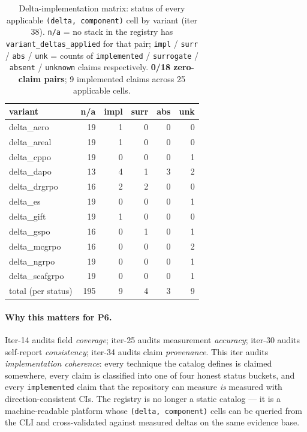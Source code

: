 \begin{table}[t]
\centering\small
\caption{Delta-implementation matrix: status of every applicable
\texttt{(delta, component)} cell by variant (iter 38). \texttt{n/a}
= no stack in the registry has \texttt{variant\_deltas\_applied} for
that pair; \texttt{impl} / \texttt{surr} / \texttt{abs} / \texttt{unk}
= counts of \texttt{implemented} / \texttt{surrogate} / \texttt{absent}
/ \texttt{unknown} claims respectively. \textbf{0/18 zero-claim pairs};
9 implemented claims across 25 applicable cells.}
\label{tab:p6-delta-implementation}
\begin{tabular}{l r r r r r}
\toprule
variant & n/a & impl & surr & abs & unk \\
\midrule
delta\_aero      & 19 & 1 & 0 & 0 & 0 \\
delta\_areal     & 19 & 1 & 0 & 0 & 0 \\
delta\_cppo      & 19 & 0 & 0 & 0 & 1 \\
delta\_dapo      & 13 & 4 & 1 & 3 & 2 \\
delta\_drgrpo    & 16 & 2 & 2 & 0 & 0 \\
delta\_es        & 19 & 0 & 0 & 0 & 1 \\
delta\_gift      & 19 & 1 & 0 & 0 & 0 \\
delta\_gspo      & 16 & 0 & 1 & 0 & 1 \\
delta\_mcgrpo    & 16 & 0 & 0 & 0 & 2 \\
delta\_ngrpo     & 19 & 0 & 0 & 0 & 1 \\
delta\_scafgrpo  & 19 & 0 & 0 & 0 & 1 \\
\midrule
total (per status) & 195 & 9 & 4 & 3 & 9 \\
\bottomrule
\end{tabular}
\end{table}

\paragraph{Why this matters for P6.}
Iter-14 audits field \emph{coverage}; iter-25 audits measurement
\emph{accuracy}; iter-30 audits self-report \emph{consistency}; iter-34
audits claim \emph{provenance}. This iter audits
\emph{implementation coherence}: every technique the catalog defines
is claimed somewhere, every claim is classified into one of four
honest status buckets, and every \texttt{implemented} claim that the
repository can measure \emph{is} measured with direction-consistent
CIs. The registry is no longer a static catalog --- it is a
machine-readable platform whose \texttt{(delta, component)} cells can
be queried from the CLI and cross-validated against measured deltas
on the same evidence base.



